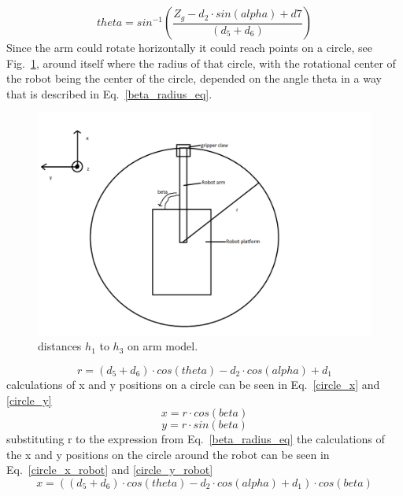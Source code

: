 \begin{equation}
    theta = sin^{-1}(\frac{Z_g - d_2 \cdot sin(alpha) + d7}{(d_5 + d_6)})
    \label{inv_theta_calc_5}
\end{equation}
Since the arm could rotate horizontally it could reach points on a circle, see Fig.~\ref{inv_beta_radius_img}, around itself where the radius of that circle, with the rotational center of the robot being the center of the circle, depended on the angle theta in a way that is described in Eq.~\eqref{beta_radius_eq}.
\begin{figure}[h]
    \centering
    \includegraphics[width=\textwidth]{sections/assets/inv_beta_radius.png}
    \caption{distances \(h_1\) to \(h_3\) on arm model.}
    \label{inv_beta_radius_img}
\end{figure}
\begin{equation}
    r = (d_5 + d_6)\cdot cos(theta) - d_2\cdot cos(alpha) + d_1
    \label{beta_radius_eq}
\end{equation}
calculations of x and y positions on a circle can be seen in Eq.~\eqref{circle_x} and \eqref{circle_y}
\begin{equation}
    x = r\cdot cos(beta)
    \label{circle_x}
\end{equation}
\begin{equation}
    y = r\cdot sin(beta)
    \label{circle_y}
\end{equation}
substituting r to the expression from Eq.~\eqref{beta_radius_eq} the calculations of the x and y positions on the circle around the robot can be seen in Eq.~\eqref{circle_x_robot} and \ref{circle_y_robot}
\begin{equation}
    x = ((d_5 + d_6)\cdot cos(theta) - d_2\cdot cos(alpha) + d_1)\cdot cos(beta)
    \label{circle_x_robot}
\end{equation}
